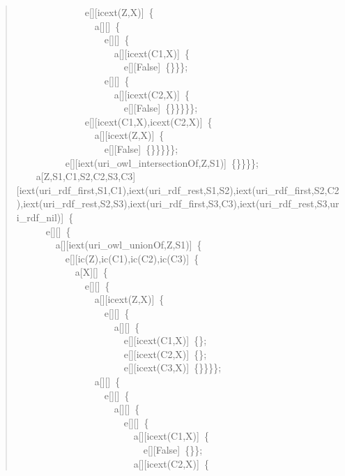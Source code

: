 \begin{quote}
{~~~~~~~~~~~~~~e[][icext(Z,X)]~\{\\
~~~~~~~~~~~~~~~~a[][]~\{\\
~~~~~~~~~~~~~~~~~~e[][]~\{\\
~~~~~~~~~~~~~~~~~~~~a[][icext(C1,X)]~\{\\
~~~~~~~~~~~~~~~~~~~~~~e[][False]~\{\}\}\};\\
~~~~~~~~~~~~~~~~~~e[][]~\{\\
~~~~~~~~~~~~~~~~~~~~a[][icext(C2,X)]~\{\\
~~~~~~~~~~~~~~~~~~~~~~e[][False]~\{\}\}\}\}\};\\
~~~~~~~~~~~~~~e[][icext(C1,X),icext(C2,X)]~\{\\
~~~~~~~~~~~~~~~~a[][icext(Z,X)]~\{\\
~~~~~~~~~~~~~~~~~~e[][False]~\{\}\}\}\}\};\\
~~~~~~~~~~e[][iext(uri\_owl\_intersectionOf,Z,S1)]~\{\}\}\}\};\\
~~~~a[Z,S1,C1,S2,C2,S3,C3][iext(uri\_rdf\_first,S1,C1),iext(uri\_rdf\_rest,S1,S2),iext(uri\_rdf\_first,S2,C2),iext(uri\_rdf\_rest,S2,S3),iext(uri\_rdf\_first,S3,C3),iext(uri\_rdf\_rest,S3,uri\_rdf\_nil)]~\{\\
~~~~~~e[][]~\{\\
~~~~~~~~a[][iext(uri\_owl\_unionOf,Z,S1)]~\{\\
~~~~~~~~~~e[][ic(Z),ic(C1),ic(C2),ic(C3)]~\{\\
~~~~~~~~~~~~a[X][]~\{\\
~~~~~~~~~~~~~~e[][]~\{\\
~~~~~~~~~~~~~~~~a[][icext(Z,X)]~\{\\
~~~~~~~~~~~~~~~~~~e[][]~\{\\
~~~~~~~~~~~~~~~~~~~~a[][]~\{\\
~~~~~~~~~~~~~~~~~~~~~~e[][icext(C1,X)]~\{\};\\
~~~~~~~~~~~~~~~~~~~~~~e[][icext(C2,X)]~\{\};\\
~~~~~~~~~~~~~~~~~~~~~~e[][icext(C3,X)]~\{\}\}\}\};\\
~~~~~~~~~~~~~~~~a[][]~\{\\
~~~~~~~~~~~~~~~~~~e[][]~\{\\
~~~~~~~~~~~~~~~~~~~~a[][]~\{\\
~~~~~~~~~~~~~~~~~~~~~~e[][]~\{\\
~~~~~~~~~~~~~~~~~~~~~~~~a[][icext(C1,X)]~\{\\
~~~~~~~~~~~~~~~~~~~~~~~~~~e[][False]~\{\}\};\\
~~~~~~~~~~~~~~~~~~~~~~~~a[][icext(C2,X)]~\{\\
}
\end{quote}
